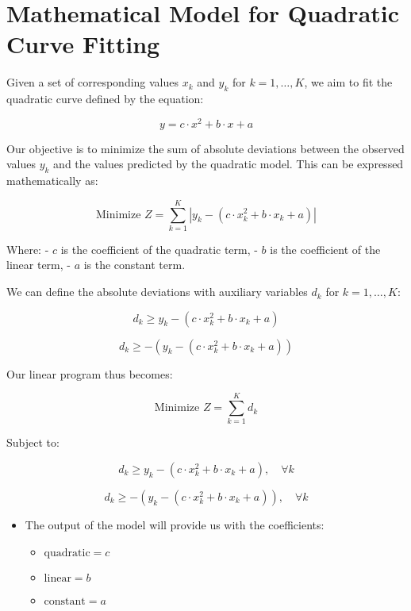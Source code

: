 \documentclass{article}
\begin{document}
\section*{Mathematical Model for Quadratic Curve Fitting}

Given a set of corresponding values \( x_k \) and \( y_k \) for \( k = 1, \ldots, K \), we aim to fit the quadratic curve defined by the equation:

\[
y = c \cdot x^2 + b \cdot x + a
\]

Our objective is to minimize the sum of absolute deviations between the observed values \( y_k \) and the values predicted by the quadratic model. This can be expressed mathematically as:

\[
\text{Minimize } Z = \sum_{k=1}^{K} |y_k - (c \cdot x_k^2 + b \cdot x_k + a)|
\]

Where:
- \( c \) is the coefficient of the quadratic term,
- \( b \) is the coefficient of the linear term,
- \( a \) is the constant term.

We can define the absolute deviations with auxiliary variables \( d_k \) for \( k = 1, \ldots, K \):

\[
d_k \geq y_k - (c \cdot x_k^2 + b \cdot x_k + a)
\]

\[
d_k \geq -(y_k - (c \cdot x_k^2 + b \cdot x_k + a))
\]

Our linear program thus becomes:

\[
\text{Minimize } Z = \sum_{k=1}^{K} d_k
\]

Subject to:

\[
d_k \geq y_k - (c \cdot x_k^2 + b \cdot x_k + a), \quad \forall k
\]

\[
d_k \geq -(y_k - (c \cdot x_k^2 + b \cdot x_k + a)), \quad \forall k
\]

\begin{itemize}
    \item The output of the model will provide us with the coefficients:
    \begin{itemize}
        \item \( \text{quadratic} = c \)
        \item \( \text{linear} = b \)
        \item \( \text{constant} = a \)
    \end{itemize}
\end{itemize}
\end{document}
